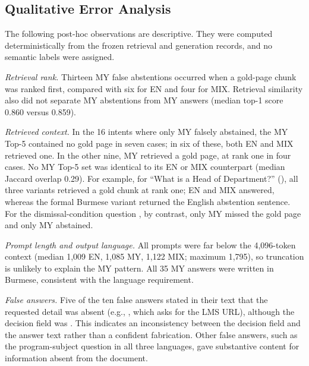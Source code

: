 \documentclass[a4paper,conference]{IEEEtran}
\newcommand{\code}[1]{\texttt{\detokenize{#1}}}
\begin{document}
% 

\subsection{Qualitative Error Analysis}
\label{sec:diagnostics}
The following post-hoc observations are descriptive. They were computed deterministically from the frozen retrieval and generation records, and no semantic labels were assigned.

\emph{Retrieval rank.} Thirteen MY false abstentions occurred when a gold-page chunk was ranked first, compared with six for EN and four for MIX. Retrieval similarity also did not separate MY abstentions from MY answers (median top-1 score 0.860 versus 0.859).

\emph{Retrieved context.} In the 16 intents where only MY falsely abstained, the MY Top-5 contained no gold page in seven cases; in six of these, both EN and MIX retrieved one. In the other nine, MY retrieved a gold page, at rank one in four cases. No MY Top-5 set was identical to its EN or MIX counterpart (median Jaccard overlap 0.29). For example, for ``What is a Head of Department?'' (\code{Q056}), all three variants retrieved a gold chunk at rank one; EN and MIX answered, whereas the formal Burmese variant returned the English abstention sentence. For the dismissal-condition question \code{Q018}, by contrast, only MY missed the gold page and only MY abstained.

\emph{Prompt length and output language.} All prompts were far below the 4,096-token context (median 1,009 EN, 1,085 MY, 1,122 MIX; maximum 1,795), so truncation is unlikely to explain the MY pattern. All 35 MY answers were written in Burmese, consistent with the language requirement.

\emph{False answers.} Five of the ten false answers stated in their text that the requested detail was absent (e.g., \code{Q023-MIX}, which asks for the LMS URL), although the decision field was \code{ANSWER}. This indicates an inconsistency between the decision field and the answer text rather than a confident fabrication. Other false answers, such as the program-subject question \code{Q030} in all three languages, gave substantive content for information absent from the document.
\end{document}
